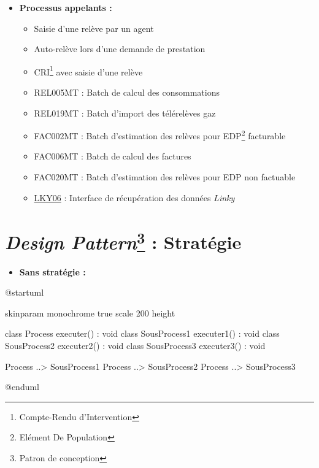 \documentclass[a4paper, 12pt]{report}
\begin{document}
\begin{itemize}
  \item \textbf{Processus appelants :}\\
  \begin{itemize}
    \item Saisie d'une relève par un agent
    \item Auto-relève lors d'une demande de prestation
    \item CRI\footnote{Compte-Rendu d'Intervention} avec saisie d'une relève
    \item REL005MT : Batch de calcul des consommations
    \item REL019MT : Batch d'import des télérelèves gaz
    \item FAC002MT : Batch d'estimation des relèves pour EDP\footnote{Elément De Population} facturable
    \item FAC006MT : Batch de calcul des factures
    \item FAC020MT : Batch d'estimation des relèves pour EDP non factuable
    \item \underline{LKY06} : Interface de récupération des données \textit{Linky}
  \end{itemize}
\end{itemize}

\chapter{\textit{Design Pattern}\footnote{Patron de conception} : Stratégie}
\label{appendix:strategy}

\begin{itemize}
  \item \textbf{Sans stratégie :}\\
\end{itemize}

\begin{center}
  \begin{plantuml}
    @startuml

    skinparam monochrome true
    scale 200 height

    class Process {
      executer() : void
    }
    class SousProcess1 {
      executer1() : void
    }
    class SousProcess2 {
      executer2() : void
    }
    class SousProcess3 {
      executer3() : void
    }

    Process ..> SousProcess1
    Process ..> SousProcess2
    Process ..> SousProcess3

    @enduml
  \end{plantuml}
\end{center}
\vspace{0.5cm}
\end{document}
